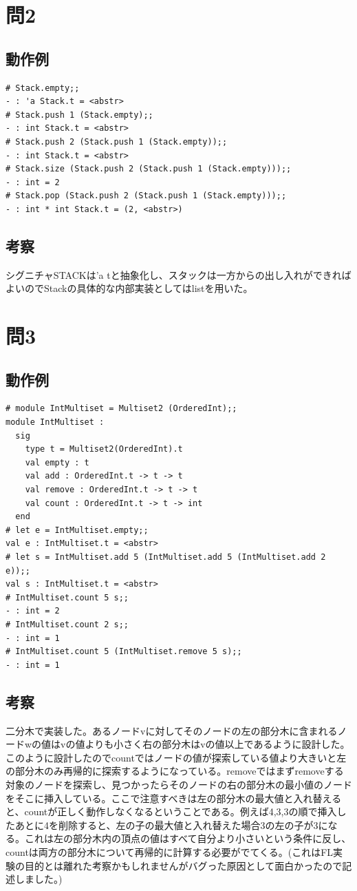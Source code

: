 \documentclass[11pt,a4paper]{jsarticle}
\begin{document}
\section*{問2}
\subsection*{動作例}
\begin{lstlisting}[basicstyle=\ttfamily\footnotesize, frame=single]
# Stack.empty;;
- : 'a Stack.t = <abstr>
# Stack.push 1 (Stack.empty);;
- : int Stack.t = <abstr>
# Stack.push 2 (Stack.push 1 (Stack.empty));;
- : int Stack.t = <abstr>
# Stack.size (Stack.push 2 (Stack.push 1 (Stack.empty)));;
- : int = 2
# Stack.pop (Stack.push 2 (Stack.push 1 (Stack.empty)));;
- : int * int Stack.t = (2, <abstr>)
\end{lstlisting}
\subsection*{考察}
シグニチャSTACKは'a tと抽象化し、スタックは一方からの出し入れができればよいのでStackの具体的な内部実装としてはlistを用いた。
\section*{問3}
\subsection*{動作例}
\begin{lstlisting}[basicstyle=\ttfamily\footnotesize, frame=single]
# module IntMultiset = Multiset2 (OrderedInt);;
module IntMultiset :
  sig
    type t = Multiset2(OrderedInt).t
    val empty : t
    val add : OrderedInt.t -> t -> t
    val remove : OrderedInt.t -> t -> t
    val count : OrderedInt.t -> t -> int
  end
# let e = IntMultiset.empty;;
val e : IntMultiset.t = <abstr>
# let s = IntMultiset.add 5 (IntMultiset.add 5 (IntMultiset.add 2 e));;
val s : IntMultiset.t = <abstr>
# IntMultiset.count 5 s;;
- : int = 2
# IntMultiset.count 2 s;;
- : int = 1
# IntMultiset.count 5 (IntMultiset.remove 5 s);;
- : int = 1
\end{lstlisting}
\subsection*{考察}
二分木で実装した。あるノードvに対してそのノードの左の部分木に含まれるノードwの値はvの値よりも小さく右の部分木はvの値以上であるように設計した。このように設計したのでcountではノードの値が探索している値より大きいと左の部分木のみ再帰的に探索するようになっている。removeではまずremoveする対象のノードを探索し、見つかったらそのノードの右の部分木の最小値のノードをそこに挿入している。ここで注意すべきは左の部分木の最大値と入れ替えると、countが正しく動作しなくなるということである。例えば4,3,3の順で挿入したあとに4を削除すると、左の子の最大値と入れ替えた場合3の左の子が3になる。これは左の部分木内の頂点の値はすべて自分より小さいという条件に反し、countは両方の部分木について再帰的に計算する必要がでてくる。(これはFL実験の目的とは離れた考察かもしれませんがバグった原因として面白かったので記述しました。)
\end{document}
